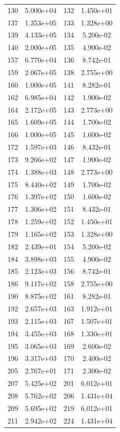 \documentclass[12pt]{article}
\begin{document}
\begin{longtable}{@{}cccc@{}}
130 & 5.000e+04 & 132 & 1.450e+01 \\
137 & 1.353e+05 & 133 & 1.328e+00 \\
139 & 4.133e+05 & 134 & 5.200e-02 \\
140 & 2.000e+05 & 135 & 4.900e-02 \\
157 & 6.770e+04 & 136 & 8.742e-01 \\
159 & 2.067e+05 & 138 & 2.755e+00 \\
160 & 1.000e+05 & 141 & 8.282e-01 \\
162 & 6.985e+04 & 142 & 1.900e-02 \\
164 & 2.172e+05 & 143 & 2.773e+00 \\
165 & 1.609e+05 & 144 & 1.700e-02 \\
166 & 1.000e+05 & 145 & 1.600e-02 \\
172 & 1.597e+03 & 146 & 8.432e-01 \\
173 & 9.266e+02 & 147 & 1.900e-02 \\
174 & 1.388e+03 & 148 & 2.773e+00 \\
175 & 8.440e+02 & 149 & 1.700e-02 \\
176 & 1.397e+02 & 150 & 1.600e-02 \\
177 & 1.306e+02 & 151 & 8.432e-01 \\
178 & 1.259e+02 & 152 & 1.450e+01 \\
179 & 1.165e+02 & 153 & 1.328e+00 \\
182 & 2.439e+01 & 154 & 5.200e-02 \\
184 & 3.898e+03 & 155 & 4.900e-02 \\
185 & 2.123e+03 & 156 & 8.742e-01 \\
186 & 9.117e+02 & 158 & 2.755e+00 \\
190 & 8.875e+02 & 161 & 8.282e-01 \\
192 & 2.657e+03 & 163 & 1.912e+01 \\
193 & 2.115e+03 & 167 & 1.507e+01 \\
194 & 3.455e+03 & 168 & 1.330e+01 \\
195 & 3.065e+03 & 169 & 2.600e-02 \\
196 & 3.317e+03 & 170 & 2.400e-02 \\
205 & 2.767e+01 & 171 & 2.300e-02 \\
207 & 5.425e+02 & 201 & 6.012e+01 \\
208 & 5.762e+02 & 206 & 1.431e+04 \\
209 & 5.695e+02 & 219 & 6.012e+01 \\
211 & 2.942e+02 & 224 & 1.431e+04 \\

\end{longtable}
\end{document}
